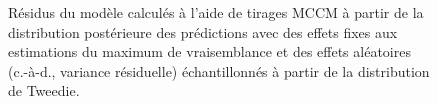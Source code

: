 \begin{figure}[htb]
    \centering
    \caption{Résidus du modèle calculés à l'aide de tirages MCCM à partir de la distribution postérieure des prédictions avec des effets fixes aux estimations du maximum de vraisemblance et des effets aléatoires (c.-à-d., variance résiduelle) échantillonnés à partir de la distribution de Tweedie.}
    \label{fig:qqplot-stock}
\end{figure}


